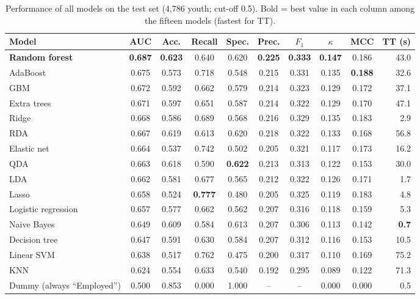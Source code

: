 \documentclass[11pt,a4paper]{article}
\begin{document}
\begin{table}[H]
\centering
\caption{Performance of all models on the test set (4{,}786 youth; cut-off 0.5). Bold = best value
in each column among the fifteen models (fastest for TT).}
\label{tab:test}
\footnotesize
\setlength{\tabcolsep}{4pt}
\begin{tabularx}{\textwidth}{@{}Y c c c c c c c c r@{}}
\toprule
\textbf{Model} & \textbf{AUC} & \textbf{Acc.} & \textbf{Recall} & \textbf{Spec.} & \textbf{Prec.} & \textbf{$F_1$} & \textbf{$\kappa$} & \textbf{MCC} & \textbf{TT (s)} \\
\midrule
{}\textbf{Random forest} & \textbf{0.687} & \textbf{0.623} & 0.640 & 0.620 & \textbf{0.225} & \textbf{0.333} & \textbf{0.147} & 0.186 & 43.0 \\
AdaBoost & 0.675 & 0.573 & 0.718 & 0.548 & 0.215 & 0.331 & 0.135 & \textbf{0.188} & 32.6 \\
GBM & 0.672 & 0.592 & 0.662 & 0.579 & 0.214 & 0.323 & 0.129 & 0.172 & 37.1 \\
Extra trees & 0.671 & 0.597 & 0.651 & 0.587 & 0.214 & 0.322 & 0.129 & 0.170 & 47.1 \\
Ridge & 0.668 & 0.586 & 0.689 & 0.568 & 0.216 & 0.329 & 0.135 & 0.183 & 2.9 \\
RDA & 0.667 & 0.619 & 0.613 & 0.620 & 0.218 & 0.322 & 0.133 & 0.168 & 56.8 \\
Elastic net & 0.664 & 0.537 & 0.742 & 0.502 & 0.205 & 0.321 & 0.117 & 0.173 & 16.2 \\
QDA & 0.663 & 0.618 & 0.590 & \textbf{0.622} & 0.213 & 0.313 & 0.122 & 0.153 & 30.0 \\
LDA & 0.662 & 0.581 & 0.677 & 0.565 & 0.212 & 0.322 & 0.126 & 0.171 & 1.7 \\
Lasso & 0.658 & 0.524 & \textbf{0.777} & 0.480 & 0.205 & 0.325 & 0.119 & 0.183 & 4.8 \\
Logistic regression & 0.657 & 0.577 & 0.662 & 0.562 & 0.207 & 0.316 & 0.118 & 0.159 & 5.3 \\
Naive Bayes & 0.649 & 0.609 & 0.584 & 0.613 & 0.207 & 0.306 & 0.113 & 0.142 & \textbf{0.7} \\
Decision tree & 0.647 & 0.591 & 0.630 & 0.584 & 0.207 & 0.312 & 0.116 & 0.153 & 10.5 \\
Linear SVM & 0.638 & 0.517 & 0.762 & 0.475 & 0.200 & 0.317 & 0.110 & 0.169 & 75.2 \\
KNN & 0.624 & 0.554 & 0.633 & 0.540 & 0.192 & 0.295 & 0.089 & 0.122 & 71.3 \\
\midrule
Dummy (always ``Employed'') & 0.500 & 0.853 & 0.000 & 1.000 & -- & -- & 0.000 & 0.000 & 0.5 \\
\bottomrule
\end{tabularx}
\end{table}
\end{document}
